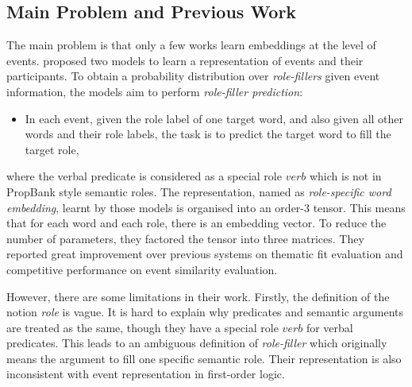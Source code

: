 \documentclass[a4paper]{article}
\begin{document}
\subsection{Main Problem and Previous Work}
The main problem is that only a few works learn embeddings at the level of events. \citet{tilk2016event} proposed two models to learn a representation of events and their participants. To obtain a probability distribution over \textit{role-fillers} given event information, the models aim to perform \textit{role-filler prediction}: 
\begin{itemize}
    \item  In each event, given the role label of one target word, and also given all other words and their role labels, the task is to predict the target word to fill the target role,
\end{itemize}
where the verbal predicate is considered as a special role $verb$ which is not in PropBank style semantic roles. The representation, named as \textit{role-specific word embedding}, learnt by those models is organised into an order-3 tensor. This means that for each word and each role, there is an embedding vector. To reduce the number of parameters, they factored the tensor into three matrices. They reported great improvement over previous systems on thematic fit evaluation and competitive performance on event similarity evaluation. 

However, there are some limitations in their work. Firstly, the definition of the notion \textit{role} is vague. It is hard to explain why predicates and semantic arguments are treated as the same, though they have a special role $verb$ for verbal predicates. This leads to an ambiguous definition of \textit{role-filler} which originally means the argument to fill one specific semantic role. Their representation is also inconsistent with event representation in first-order logic. 
% 
% 
% 
% 
% 
%
\end{document}
